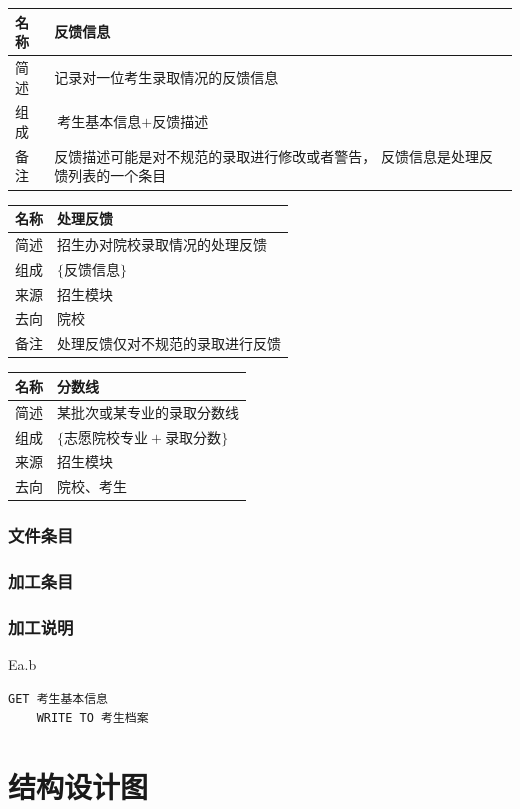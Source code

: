 \documentclass[CJK,utf8]{ctexrep}
\begin{document}
\begin{tabularx}{0.85\textwidth}{|l|X|}
	\hline
	\textbf{名称} & \textbf{反馈信息} \\
	\hline
	简述 & 记录对一位考生录取情况的反馈信息 \\
	\hline
	组成 & $\text{考生基本信息}+\text{反馈描述}$ \\
	\hline
	\multirow{2}{*}{备注} & 反馈描述可能是对不规范的录取进行修改或者警告，
	反馈信息是处理反馈列表的一个条目 \\
	\hline
\end{tabularx}

\begin{tabularx}{0.85\textwidth}{|l|X|}
	\hline
	\textbf{名称} & \textbf{处理反馈} \\
	\hline
	简述 & 招生办对院校录取情况的处理反馈 \\
	\hline
	组成 & $\lbrace\text{反馈信息}\rbrace$ \\
	\hline
	来源 & 招生模块 \\
	\hline
	去向 & 院校 \\
	\hline
	备注 & 处理反馈仅对不规范的录取进行反馈 \\
	\hline
\end{tabularx}

\begin{tabularx}{0.85\textwidth}{|l|X|}
	\hline
	\textbf{名称} & \textbf{分数线} \\
	\hline
	简述 & 某批次或某专业的录取分数线 \\
	\hline
	组成 & $\lbrace\text{志愿院校专业}+\text{录取分数}\rbrace$ \\
	\hline
	来源 & 招生模块 \\
	\hline
	去向 & 院校、考生 \\
	\hline
\end{tabularx}

\subsubsection*{文件条目}

\subsubsection*{加工条目}

\subsubsection*{加工说明}

Ea.b
\begin{lstlisting}[style=proc]
	GET 考生基本信息
	WRITE TO 考生档案
\end{lstlisting}

\section*{结构设计图}
\end{document}
